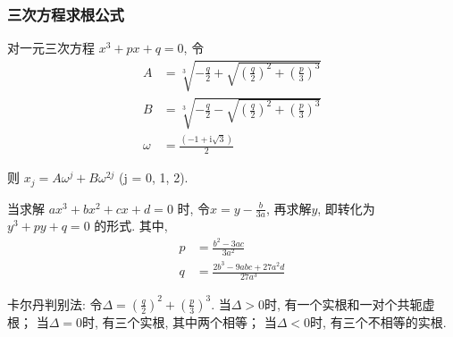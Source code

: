 \documentclass[landscape, twocolumn, 8pt, a4paper, twoside]{extarticle}
\begin{document}
  \subsubsection{三次方程求根公式}
      对一元三次方程
      $x ^ 3 + px + q = 0$,
      令
      \begin{align*}
        A &= \sqrt[3]{-\frac{q}{2}+\sqrt{(\frac{q}{2})^2+(\frac{p}{3})^3}} \\
        B &= \sqrt[3]{-\frac{q}{2}-\sqrt{(\frac{q}{2})^2+(\frac{p}{3})^3}} \\ 
        \omega &= \frac{(-1 + \mathrm{i} \sqrt{3})}{2}
      \end{align*}
      
      则 $x_j = A\omega^{j} + B\omega^{2j}$ (j = 0, 1, 2).
      
      当求解 $ax ^ 3 + bx ^ 2 + cx + d = 0$ 时, 令$x = y - \frac{b}{3a}$, 再求解$y$, 即转化为$y^3 + py + q = 0$ 的形式. 
      其中, 
      \begin{align*}
        p &= \frac{b^2 - 3ac}{3a^2} \\
        q &= \frac{2b ^ 3 - 9 abc + 27 a ^ 2 d}{27 a ^ 3}
      \end{align*}

      卡尔丹判别法: 
      令$\Delta = (\frac{q}{2}) ^ 2 + (\frac{p}{3}) ^ 3$. 
      当$\Delta > 0$时, 有一个实根和一对个共轭虚根；
      当$\Delta = 0$时, 有三个实根, 其中两个相等；
      当$\Delta < 0$时, 有三个不相等的实根. 
    
\end{document}
